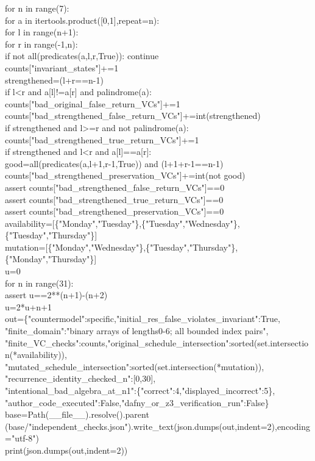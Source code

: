 \documentclass[10pt]{article}
\begin{document}
{for n in range(7):\\
 for a in itertools.product([0,1],repeat=n):\\
  for l in range(n+1):\\
   for r in range(-1,n):\\
    if not all(predicates(a,l,r,True)): continue\\
    counts["invariant\_states"]+=1\\
    strengthened=(l+r==n-1)\\
    if l<r and a[l]!=a[r] and palindrome(a):\\
     counts["bad\_original\_false\_return\_VCs"]+=1\\
     counts["bad\_strengthened\_false\_return\_VCs"]+=int(strengthened)\\
    if strengthened and l>=r and not palindrome(a):\\
     counts["bad\_strengthened\_true\_return\_VCs"]+=1\\
    if strengthened and l<r and a[l]==a[r]:\\
     good=all(predicates(a,l+1,r-1,True)) and (l+1+r-1==n-1)\\
     counts["bad\_strengthened\_preservation\_VCs"]+=int(not good)\\
assert counts["bad\_strengthened\_false\_return\_VCs"]==0\\
assert counts["bad\_strengthened\_true\_return\_VCs"]==0\\
assert counts["bad\_strengthened\_preservation\_VCs"]==0\\
availability=[\{"Monday","Tuesday"\},\{"Tuesday","Wednesday"\},\{"Tuesday","Thursday"\}]\\
mutation=[\{"Monday","Wednesday"\},\{"Tuesday","Thursday"\},\{"Monday","Thursday"\}]\\
u=0\\
for n in range(31):\\
 assert u==2**(n+1)-(n+2)\\
 u=2*u+n+1\\
out=\{"countermodel":specific,"initial\_res\_false\_violates\_invariant":True,\\
 "finite\_domain":"binary arrays of lengths0-6; all bounded index pairs",\\
 "finite\_VC\_checks":counts,"original\_schedule\_intersection":sorted(set.intersection(*availability)),\\
 "mutated\_schedule\_intersection":sorted(set.intersection(*mutation)),\\
 "recurrence\_identity\_checked\_n":[0,30],\\
 "intentional\_bad\_algebra\_at\_n1":\{"correct":4,"displayed\_incorrect":5\},\\
 "author\_code\_executed":False,"dafny\_or\_z3\_verification\_run":False\}\\
base=Path(\_\_file\_\_).resolve().parent\\
(base/"independent\_checks.json").write\_text(json.dumps(out,indent=2),encoding="utf-8")\\
print(json.dumps(out,indent=2))}\par
\end{document}
